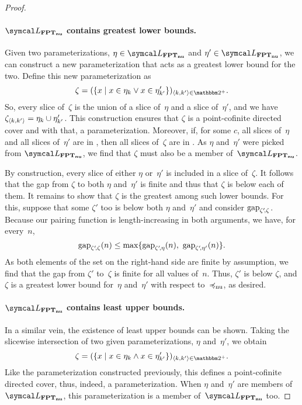 \begin{proof}
  \paragraph{$\calL_\clnu{FPT}$ contains greatest lower bounds.}
  Given two parameterizations, $\eta \in \calL_\clnu{FPT}$ and $\eta' \in \calL_\clnu{FPT}$, we can construct a new parameterization that acts as a greatest lower bound for the two.
  Define this new parameterization as
  \begin{equation*}
    \zeta \deq (\{x \st x \in \eta_k \lor x \in \eta'_{k'}\})_{\pair{k}{k'} \in \binary^+}.
  \end{equation*}
  So, every slice of~$\zeta$ is the union of a slice of~$\eta$ and a slice of~$\eta'$, and we have $\zeta_{\langle k, k'\rangle} = \eta_k \cup \eta'_{k'}$.
  This construction ensures that $\zeta$ is a point-cofinite directed cover and with that, a parameterization.
  Moreover, if, for some $c$, all slices of~$\eta$ and all slices of~$\eta'$ are in , then all slices of~$\zeta$ are in .
  As $\eta$ and~$\eta'$ were picked from $\calL_\clnu{FPT}$, we find that $\zeta$ must also be a member of~$\calL_\clnu{FPT}$.

  By construction, every slice of either $\eta$ or~$\eta'$ is included in a slice of~$\zeta$.
  It follows that the gap from $\zeta$ to both $\eta$ and~$\eta'$ is finite and thus that $\zeta$ is below each of them.
  It remains to show that $\zeta$ is the greatest among such lower bounds.
  For this, suppose that some $\zeta'$ too is below both $\eta$ and~$\eta'$ and consider $\operatorname{gap}_{\zeta'\!, \zeta}$.
  Because our pairing function is length-increasing in both arguments, we have, for every~$n$,
  \begin{equation*}
    \operatorname{gap}_{\zeta'\!, \zeta}(n) \le \max\{\operatorname{gap}_{\zeta'\!, \eta}(n),\ \operatorname{gap}_{\zeta'\!, \eta'}(n)\}.
  \end{equation*}
  As both elements of the set on the right-hand side are finite by assumption, we find that the gap from $\zeta'$ to~$\zeta$ is finite for all values of~$n$.
  Thus, $\zeta'$ is below $\zeta$, and $\zeta$ is a greatest lower bound for~$\eta$ and~$\eta'$ with respect to~$\preccurlyeq_\mathrm{nu}$, as desired.

  \paragraph{$\calL_\clnu{FPT}$ contains least upper bounds.}
  In a similar vein, the existence of least upper bounds can be shown.
  Taking the slicewise intersection of two given parameterizations, $\eta$ and~$\eta'$, we obtain
  \begin{equation*}
    \zeta \deq (\{x \st x \in \eta_k \land x \in \eta'_{k'}\})_{\pair{k}{k'} \in \binary^+}.
  \end{equation*}
  Like the parameterization constructed previously, this defines a point-cofinite directed cover, thus, indeed, a parameterization.
  When $\eta$ and~$\eta'$ are members of~$\calL_\clnu{FPT}$, this parameterization is a member of~$\calL_\clnu{FPT}$ too.


\end{proof}
